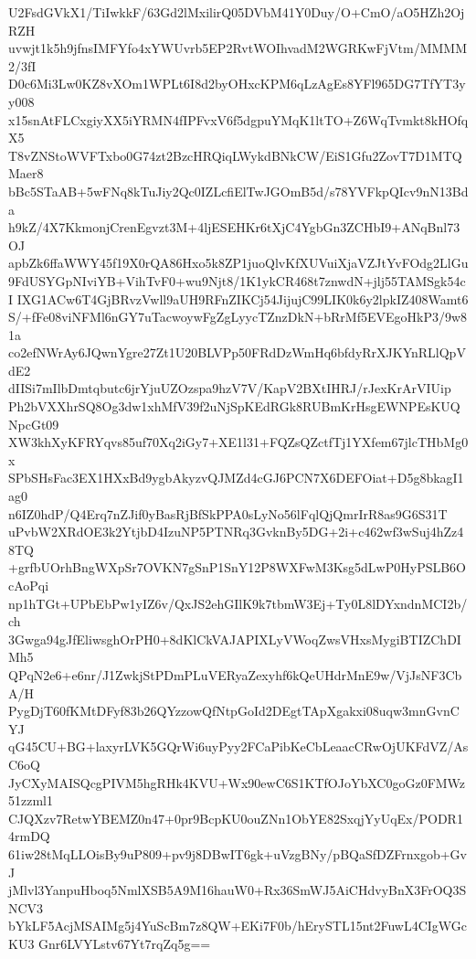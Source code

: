 U2FsdGVkX1/TiIwkkF/63Gd2lMxilirQ05DVbM41Y0Duy/O+CmO/aO5HZh2OjRZH
uvwjt1k5h9jfnsIMFYfo4xYWUvrb5EP2RvtWOIhvadM2WGRKwFjVtm/MMMM2/3fI
D0c6Mi3Lw0KZ8vXOm1WPLt6I8d2byOHxcKPM6qLzAgEs8YFl965DG7TfYT3yy008
x15snAtFLCxgiyXX5iYRMN4fIPFvxV6f5dgpuYMqK1ltTO+Z6WqTvmkt8kHOfqX5
T8vZNStoWVFTxbo0G74zt2BzcHRQiqLWykdBNkCW/EiS1Gfu2ZovT7D1MTQMaer8
bBc5STaAB+5wFNq8kTuJiy2Qc0IZLcfiElTwJGOmB5d/s78YVFkpQIcv9nN13Bda
h9kZ/4X7KkmonjCrenEgvzt3M+4ljESEHKr6tXjC4YgbGn3ZCHbI9+ANqBnl73OJ
apbZk6ffaWWY45f19X0rQA86Hxo5k8ZP1juoQlvKfXUVuiXjaVZJtYvFOdg2LlGu
9FdUSYGpNIviYB+VihTvF0+wu9Njt8/1K1ykCR468t7znwdN+jlj55TAMSgk54cI
IXG1ACw6T4GjBRvzVwll9aUH9RFnZIKCj54JijujC99LIK0k6y2lpkIZ408Wamt6
S/+fFe08viNFMl6nGY7uTacwoywFgZgLyycTZnzDkN+bRrMf5EVEgoHkP3/9w81a
co2efNWrAy6JQwnYgre27Zt1U20BLVPp50FRdDzWmHq6bfdyRrXJKYnRLlQpVdE2
dIISi7mIlbDmtqbutc6jrYjuUZOzspa9hzV7V/KapV2BXtIHRJ/rJexKrArVIUip
Ph2bVXXhrSQ8Og3dw1xhMfV39f2uNjSpKEdRGk8RUBmKrHsgEWNPEsKUQNpcGt09
XW3khXyKFRYqvs85uf70Xq2iGy7+XE1l31+FQZsQZctfTj1YXfem67jlcTHbMg0x
SPbSHsFac3EX1HXxBd9ygbAkyzvQJMZd4cGJ6PCN7X6DEFOiat+D5g8bkagI1ag0
n6IZ0hdP/Q4Erq7nZJif0yBasRjBfSkPPA0sLyNo56lFqlQjQmrIrR8as9G6S31T
uPvbW2XRdOE3k2YtjbD4IzuNP5PTNRq3GvknBy5DG+2i+c462wf3wSuj4hZz48TQ
+grfbUOrhBngWXpSr7OVKN7gSnP1SnY12P8WXFwM3Ksg5dLwP0HyPSLB6OcAoPqi
np1hTGt+UPbEbPw1yIZ6v/QxJS2ehGIlK9k7tbmW3Ej+Ty0L8lDYxndnMCI2b/ch
3Gwga94gJfEliwsghOrPH0+8dKlCkVAJAPIXLyVWoqZwsVHxsMygiBTIZChDIMh5
QPqN2e6+e6nr/J1ZwkjStPDmPLuVERyaZexyhf6kQeUHdrMnE9w/VjJsNF3CbA/H
PygDjT60fKMtDFyf83b26QYzzowQfNtpGoId2DEgtTApXgakxi08uqw3mnGvnCYJ
qG45CU+BG+laxyrLVK5GQrWi6uyPyy2FCaPibKeCbLeaacCRwOjUKFdVZ/AsC6oQ
JyCXyMAISQcgPIVM5hgRHk4KVU+Wx90ewC6S1KTfOJoYbXC0goGz0FMWz51zzml1
CJQXzv7RetwYBEMZ0n47+0pr9BcpKU0ouZNn1ObYE82SxqjYyUqEx/PODR14rmDQ
61iw28tMqLLOisBy9uP809+pv9j8DBwIT6gk+uVzgBNy/pBQaSfDZFrnxgob+GvJ
jMlvl3YanpuHboq5NmlXSB5A9M16hauW0+Rx36SmWJ5AiCHdvyBnX3FrOQ3SNCV3
bYkLF5AcjMSAIMg5j4YuScBm7z8QW+EKi7F0b/hErySTL15nt2FuwL4CIgWGcKU3
Gnr6LVYLstv67Yt7rqZq5g==
